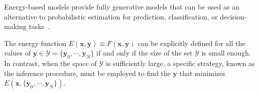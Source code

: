 \documentclass[sn-mathphys-num]{sn-jnl}%
\newcommand{\tod}[1]{{\color{magenta}\textbf{***{#1}***}}}
\newcommand{\svec}[1]{\{\ensuremath{\vec{#1}_0, \cdots, \vec{#1}_N}\}}
\renewcommand\vec{\mathbf}
\begin{document}
Energy-based models provide fully generative models that can be used as an alternative to probabilistic estimation for prediction, classification, or decision-making tasks~\cite{osadchy2004synergistic,lecun2006tutorial,haarnoja2017reinforcement,du2019implicit,grathwohl2019your}.




The energy function $E(\vec{x},\vec{y}) \equiv F(\vec{x},\vec{y})$ can be explicitly defined for all the values of $\vec{y}\in\mathcal{Y}=\svec{y}$ if and only if the size of the set $\mathcal{Y}$ is small enough. In contrast, when the space of $\mathcal{Y}$ is sufficiently large, a specific strategy, known as the inference procedure, must be employed to find the $\vec{y}$ that minimizes $E(\vec{x}, \svec{y})$. 
\end{document}

